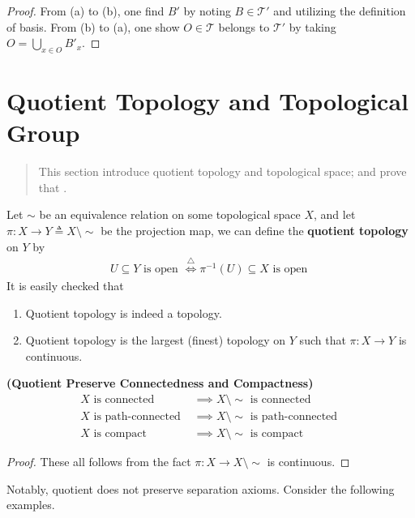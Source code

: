 \documentclass{report}
\begin{document}
\begin{proof}
From (a) to  (b), one find $B'$ by noting  $B \in \mathscr{T}'$ and utilizing the definition of basis. From (b) to (a), one show $O\in \mathscr{T }$ belongs to $\mathscr{T }'$ by taking $O=\bigcup_{x\in O} B'_x$.
\end{proof}
\section{Quotient Topology and Topological Group}
\begin{abstract}
  This section introduce quotient topology and topological space; and prove that .  
\end{abstract}
\begin{mdframed}
Let $\sim $ be an equivalence relation on some topological space $X$, and let $\pi:X\rightarrow Y\triangleq X\setminus \sim$ be the projection map, we can define the \textbf{quotient topology} on $Y$ by  
\begin{align*}
U\subseteq Y\text{ is open }\overset{\triangle}{\iff }\pi^{-1}(U)\subseteq X\text{ is open }
\end{align*}
It is easily checked that 
\begin{enumerate}[label=(\alph*)]
  \item Quotient topology is indeed a topology.  
  \item Quotient topology is the largest (finest) topology on $Y$ such that $\pi:X\rightarrow Y$ is continuous.
\end{enumerate}
\end{mdframed}
\begin{theorem}
\textbf{(Quotient Preserve Connectedness and Compactness)} 
\begin{align*}
  X\text{ is connected }&\implies X\setminus \sim \text{ is connected }\\
X\text{ is path-connected }&\implies X\setminus \sim \text{ is path-connected }\\
X\text{ is compact }&\implies X\setminus \sim \text{ is compact }
\end{align*}
\end{theorem}
\begin{proof}
These all follows from the fact $\pi:X\rightarrow X\setminus \sim $ is continuous.
\end{proof}
\begin{mdframed}
Notably, quotient does not preserve separation axioms. Consider the following examples.
\end{mdframed}
\end{document}
